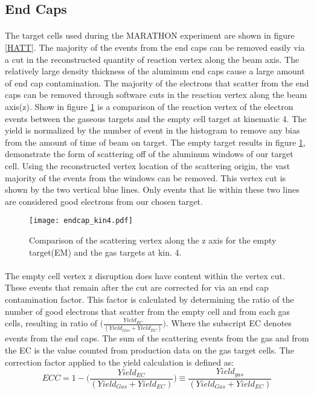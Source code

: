 \subsection{End Caps}\label{sec:ecc}
\paragraph{} The target cells used during the MARATHON experiment are shown in figure \ref{HATT}. The majority of the events from the end caps can be removed easily via a cut in the reconstructed quantity of reaction vertex along the beam axis. The relatively large density thickness of the aluminum end caps cause a large amount of end cap contamination. The majority of the electrons that scatter from the end caps can be removed through software cuts in the reaction vertex along the beam axis(z). Show in figure \ref{EC5} is a comparison of the reaction vertex of the electron events between the gaseous targets and the empty cell target at kinematic 4. The yield is normalized by the number of event in the histogram to remove any bias from the amount of time of beam on target. The empty target  results in figure \ref{EC5}, demonstrate the form of scattering off of the aluminum windows of our target cell. Using the reconstructed vertex location of the scattering origin, the vast majority of the events from the windows can be removed. This vertex cut is shown by the two vertical blue lines. Only events that lie within these two lines are considered good electrons from our chosen target. 


\begin{figure}[]
	\centering

	\texttt{[image: endcap\_kin4.pdf]}

	\caption{Comparison of the scattering vertex along the z axis for the empty target(EM) and the gas targets at kin. 4. }
	\label{EC5}
\end{figure}

\paragraph{}The empty cell vertex z disruption does have content within the vertex cut. These events that remain after the cut are corrected for via an end cap contamination factor. This  factor is calculated by determining the ratio of the number of good electrons that scatter from the empty cell and from each gas cells, resulting in ratio of $\big(\frac{Yield_{EC}}{(Yield_{Gas} + Yield_{EC})}\big)$. Where the subscript EC denotes events from the end caps. The sum of the scattering events from the gas and from the EC is the value counted from production data on the gas target cells. The correction factor applied to the yield calculation is defined as:
\begin{equation*}
ECC = 1- \big(\frac{Yield_{EC}}{(Yield_{Gas} + Yield_{EC})}\big) \equiv \frac{Yield_{gas}}{(Yield_{Gas} + Yield_{EC})}
\end{equation*}

